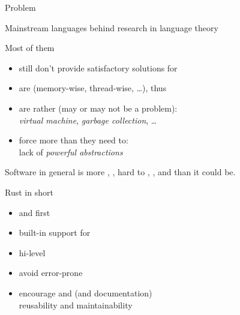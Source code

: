 \documentclass[10pt]{beamer}
\begin{document}
\begin{frame}{Problem}

  Mainstream languages  behind research in language theory
  \bigskip

  Most of them
  \begin{itemize}
    \item still don't provide satisfactory solutions for 
    \item are  (memory-wise, thread-wise, \ldots),
      thus 
    \item are rather  (may or may not be a problem):\\
      \emph{virtual machine}, \emph{garbage collection}, \ldots
    \item force more  than they need to:\\
      lack of \emph{powerful abstractions}
  \end{itemize}
  \medskip

  \pause

  Software in general is more , , hard to
  , ,  and  than it
  could be.

\end{frame}




\begin{frame}{Rust in short}

  \begin{itemize}\bigsep
    \item {} and  first
    \item built-in support for 
    \item hi-level 
    \item avoid error-prone 
    \item encourage  and 
      (and documentation)\\
      \daimpl reusability and maintainability
  \end{itemize}

\end{frame}
\end{document}

